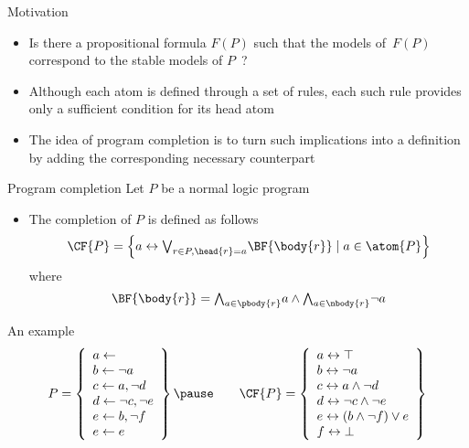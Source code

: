 \begin{frame}{Motivation}
  \bigskip
  \begin{itemize}
  \item<1-> 
    Is there a propositional formula $F(P)$ such that the models of~$F(P)$ correspond to the
    stable models of $P$~?
    \bigskip
  \item<2-> 
    Although each atom is defined through a set of rules,
    each such rule provides only a \alert{sufficient} condition for its head atom
    \medskip
  \item<3-> 
    The idea of program completion is to turn such implications into a definition
    by adding the corresponding \alert{necessary} counterpart
  \end{itemize}
\end{frame}
\begin{frame}{Program completion}
  Let $P$ be a normal logic program
  \bigskip
  \begin{itemize}
  \item
    The \alert{completion}  of $P$ is defined as follows
    \[
    \CF{P}
    =
    \left\{a \leftrightarrow \textstyle{\bigvee_{r\in P, \head{r} = a}} \BF{\body{r}} \mid a\in\atom{P}\right\}
    \]
    where
    \[
    \BF{\body{r}}
    =
    \textstyle{\bigwedge_{a\in\pbody{r}}}      a
    \wedge
    \textstyle{\bigwedge_{a\in\nbody{r}}} \neg a
    \]
  \end{itemize}
\end{frame}
\begin{frame}{An example}
\[
P
=
\left\{
  \begin{array}{l}
    a \leftarrow                  \\
    b \leftarrow \neg a          \\
    c \leftarrow a, \neg d       \\
    d \leftarrow \neg c, \neg e \\
    e \leftarrow b, \neg f       \\
    e \leftarrow e
  \end{array}
\right\}
\pause\qquad
\CF{P}
=
\left\{
  \begin{array}{l}
    a \leftrightarrow \top                  \\
    b \leftrightarrow \neg{a}               \\
    c \leftrightarrow a\wedge \neg{d}       \\
    d \leftrightarrow \neg{c}\wedge \neg{e} \\
    e \leftrightarrow (b\wedge \neg{f}) \vee e\\
    f \leftrightarrow \bot
  \end{array}
\right\}
\]
\end{frame}
